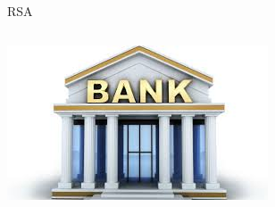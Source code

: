 \documentclass{beamer}
\begin{document}
\begin{frame}{RSA}
	\begin{columns}
		\begin{column}[T]{0.5\textwidth}
			\includegraphics[width=\textwidth]{img/bank.jpg}
		\end{column}
		

\end{columns}
\end{frame}
\end{document}
